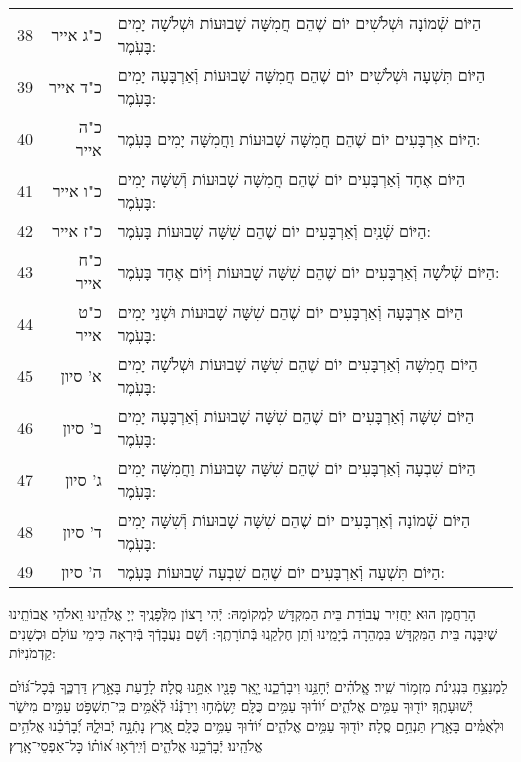 \documentclass[twoside, openany, parskip=half, 11pt]{book}
\begin{document}
\begin{scriptsize}
\begin{longtable}{ l | r | p{} }
38 & כ"ג אייר & הַיּוֹם שְֿׁמוֹנָה וּשְׁלֹשִׁים יוֹם שֶׁהֵם חֲמִשָּׁה שָׁבוּעוֹת וּשְׁלֹשָׁה יָמִים בָּעֹֽמֶר: \\
39 & כ"ד אייר & הַיּוֹם תִּשְׁעָה וּשְׁלֹשִׁים יוֹם שֶׁהֵם חֲמִשָּׁה שָׁבוּעוֹת וְֿאַרְבָּעָה יָמִים בָּעֹֽמֶר: \\
40 & כ"ה אייר & הַיּוֹם אַרְבָּעִים יוֹם שֶׁהֵם חֲמִשָּׁה שָׁבוּעוֹת וַחֲמִשָּׁה יָמִים בָּעֹֽמֶר: \\
41 & כ"ו אייר & הַיּוֹם אֶחָד וְֿאַרְבָּעִים יוֹם שֶׁהֵם חֲמִשָּׁה שָׁבוּעוֹת וְֿשִׁשָּׁה יָמִים בָּעֹֽמֶר: \\
42 & כ"ז אייר & הַיּוֹם שְֿׁנַֽיִם וְֿאַרְבָּעִים יוֹם שֶׁהֵם שִׁשָּׁה שָׁבוּעוֹת בָּעֹֽמֶר: \\
43 & כ"ח אייר & הַיּוֹם שְֿׁלֹשָׁה וְֿאַרְבָּעִים יוֹם שֶׁהֵם שִׁשָּׁה שָׁבוּעוֹת וְֿיוֹם אֶחָד בָּעֹֽמֶר: \\
44 & כ"ט אייר & הַיּוֹם אַרְבָּעָה וְֿאַרְבָּעִים יוֹם שֶׁהֵם שִׁשָּׁה שָׁבוּעוֹת וּשְׁנֵי יָמִים בָּעֹֽמֶר: \\
45 & א' סיון & הַיּוֹם חֲמִשָּׁה וְֿאַרְבָּעִים יוֹם שֶׁהֵם שִׁשָּׁה שָׁבוּעוֹת וּשְׁלֹשָׁה יָמִים בָּעֹֽמֶר: \\
46 & ב' סיון & הַיּוֹם שִׁשָּׁה וְֿאַרְבָּעִים יוֹם שֶׁהֵם שִׁשָּׁה שָׁבוּעוֹת וְֿאַרְבָּעָה יָמִים בָּעֹֽמֶר: \\
47 & ג' סיון & הַיּוֹם שִׁבְעָה וְֿאַרְבָּעִים יוֹם שֶׁהֵם שִׁשָּׁה שָבוּעוֹת וַחֲמִשָּׁה יָמִים בָּעֹֽמֶר: \\
48 & ד' סיון & הַיּוֹם שְֿׁמוֹנָה וְֿאַרְבָּעִים יוֹם שֶׁהֵם שִׁשָּׁה שָׁבוּעוֹת וְֿשִׁשָּׁה יָמִים בָּעֹֽמֶר: \\
49 & ה' סיון & הַיּוֹם תִּשְׁעָה וְֿאַרְבָּעִים יוֹם שֶׁהֵם שִׁבְעָה שָׁבוּעוֹת בָּעֹֽמֶר:
\end{longtable}
\end{scriptsize}



הָרַחֲמָן הוּא יַחֲזִיר עֲבוֹדַת בֵּית הַמִקְדָּשׁ לִמְקוֹמָהּ:
יְֿהִי רָצוֹן מִלְּֿפָנֶֽיךָ יְיָ אֱלֹהֵֽינוּ וֵאלֹהֵי אֲבוֹתֵֽינוּ שֶׁיִבָּנֶה בֵּית הַמִּקְדָּשׁ בִּמְהֵרָה בְֿיָמֵֽינוּ וְֿתֵן חֶלְקֵֽנוּ בְּֿתוֹרָתֶֽךָ: וְֿשָׁם נַעֲבָדְֿךָ בְּֿיִרְאָה כִּימֵי עוֹלָם וּכְשָׁנִים קַדְמֹנִיּוֹת:


לַמְנַצֵּ֥חַ בִּנְגִינֹ֗ת מִזְמ֥וֹר שִֽׁיר׃ אֱֽלֹהִ֗ים יְֿחָנֵּ֥נוּ וִיבָרְֿכֵ֑נוּ יָ֤אֵֽר פָּנָ֖יו אִתָּ֣נוּ סֶֽלָה׃ לָדַ֣עַת בָּאָ֣רֶץ דַּרְכֶּ֑ךָ בְּֿכׇל־גּ֝וֹיִ֗ם יְֿשׁוּעָתֶֽךָ׃ יוֹד֖וּךָ עַמִּ֥ים אֱלֹהִ֑ים י֝וֹד֗וּךָ עַמִּ֥ים כֻּלָּֽם׃ יִ֥שְׂמְֿח֥וּ וִירַנְּֿֿנ֗וּ לְֿאֻ֫מִּ֥ים כִּֽי־תִשְׁפֹּ֣ט עַמִּ֣ים מִישֹׁ֑ר וּלְאֻמִּ֓ים בָּאָ֖רֶץ תַּנְחֵ֣ם סֶֽלָה׃ יוֹד֖וּךָ עַמִּ֥ים אֱלֹהִ֑ים י֝וֹד֗וּךָ עַמִּ֥ים כֻּלָּֽם׃ אֶ֭רֶץ נָתְֿנָ֣ה יְֿבוּלָ֑הּ יְֿ֝בָרְֿכֵ֗נוּ אֱלֹהִ֥ים
אֱלֹהֵֽינוּ׃ יְֿבָרְֿכֵ֥נוּ אֱלֹהִ֑ים וְֿיִֽירְֿא֥וּ א֝וֹת֗וֹ כָּל־אַפְסֵי־אָֽרֶץ׃
\end{document}
